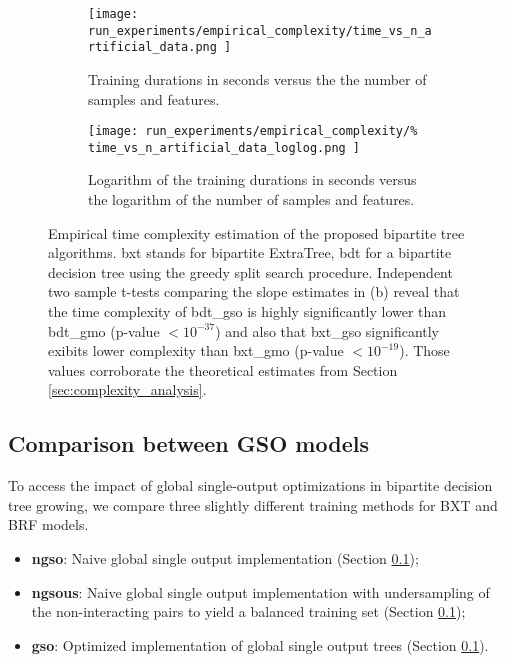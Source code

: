 \documentclass[conference]{IEEEtran}
\begin{document}
\begin{figure}[h]
    \centering
    \begin{subfigure}{0.5\textwidth}
        \texttt{[image: 
            run\_experiments/empirical\_complexity/time\_vs\_n\_artificial\_data.png
        ]}
        \caption{Training durations in seconds versus the the number of samples and features.}
    \end{subfigure}
    \begin{subfigure}{0.5\textwidth}
        \texttt{[image: 
            run\_experiments/empirical\_complexity/\%
            time\_vs\_n\_artificial\_data\_loglog.png
        ]}
        \caption{Logarithm of the training durations in seconds versus the logarithm of the number of samples and features.}
    \end{subfigure}
    \caption{
        Empirical time complexity estimation of the proposed bipartite tree
        algorithms. bxt stands for bipartite ExtraTree, bdt for a bipartite decision tree using the greedy split search procedure. Independent two sample t-tests comparing the slope estimates in (b) reveal that the time complexity of bdt\_gso is highly significantly lower than bdt\_gmo (p-value $< 10^{-37}$) and also that bxt\_gso significantly exibits lower complexity than bxt\_gmo (p-value $< 10^{-19}$). Those values
        corroborate the theoretical estimates from Section \ref{sec:complexity_analysis}.
    }
    \label{fig:empirical_complexity}
\end{figure}

\subsection{Comparison between GSO models}

To access the impact of global single-output optimizations in bipartite decision tree growing, we compare three slightly different training methods for BXT and BRF models.

\begin{itemize}
    \item \textbf{ngso}: Naive global single output implementation (Section \ref{});
    \item \textbf{ngsous}: Naive global single output implementation with undersampling of the non-interacting pairs to yield a balanced training set (Section \ref{});
    \item \textbf{gso}: Optimized implementation of global single output trees (Section \ref{}).
\end{itemize}
\end{document}

